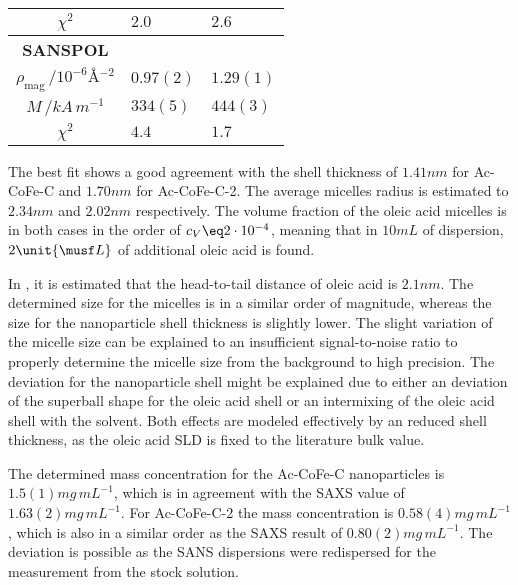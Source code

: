 \documentclass[\main/dresen_thesis.tex]{subfiles}
\begin{document}
\begin{table}[!htbp]
\begin{tabular}{ c | l | l }
        \hline
        \rule{0pt}{2ex} $\chi^2$                                                     & $2.0$          & $2.6$      \\
        \hline
        \textbf{SANSPOL}\\
        \hline
        \rule{0pt}{2ex} $\rho_\mathrm{mag} \, / \unit{10^{-6} \angstrom^{-2}}$       & $0.97(2)$      & $1.29(1)$  \\
        \rule{0pt}{2ex} $M \, / \unit{kA \,m^{-1}}$                                  & $334(5)$       & $444(3)$   \\
        \hline
        \rule{0pt}{2ex} $\chi^2$                                                     & $4.4$          & $1.7$      \\
      \end{tabular}
    \end{table}

    The best fit shows a good agreement with the shell thickness of $1.41 \unit{nm}$ for Ac-CoFe-C and $1.70 \unit{nm}$ for Ac-CoFe-C-2.
    The average micelles radius is estimated to $2.34 \unit{nm}$ and $2.02 \unit{nm}$ respectively.
    The volume fraction of the oleic acid micelles is in both cases in the order of $c_V \eq 2 \cdot 10^{-4}$, meaning that in $10 \unit{mL}$ of dispersion, $2 \unit{\musf L}$ of additional oleic acid is found.

    In \cite{Disch_2010_Thesp}, it is estimated that the head-to-tail distance of oleic acid is $2.1 \unit{nm}$.
    The determined size for the micelles is in a similar order of magnitude, whereas the size for the nanoparticle shell thickness is slightly lower.
    The slight variation of the micelle size can be explained to an insufficient signal-to-noise ratio to properly determine the micelle size from the background to high precision.
    The deviation for the nanoparticle shell might be explained due to either an deviation of the superball shape for the oleic acid shell or an intermixing of the oleic acid shell with the solvent.
    Both effects are modeled effectively by an reduced shell thickness, as the oleic acid SLD is fixed to the literature bulk value.

    The determined mass concentration for the Ac-CoFe-C nanoparticles is $1.5(1) \unit{mg\, mL^{-1}}$, which is in agreement with the SAXS value of $1.63(2) \unit{mg\, mL^{-1}}$.
    For Ac-CoFe-C-2 the mass concentration is $0.58(4) \unit{mg\, mL^{-1}}$, which is also in a similar order as the SAXS result of $0.80(2) \unit{mg \, mL^{-1}}$.
    The deviation is possible as the SANS dispersions were redispersed for the measurement from the stock solution.
\end{document}

